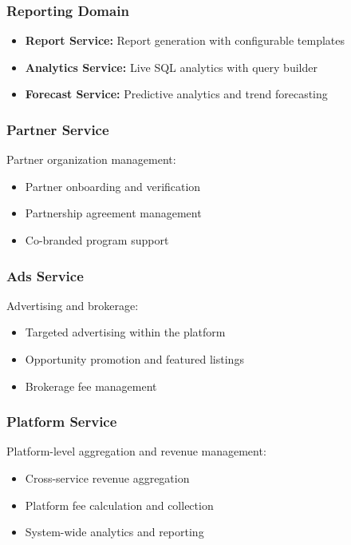 \subsubsection{Reporting Domain}

\begin{itemize}
  \item \textbf{Report Service:} Report generation with configurable templates
  \item \textbf{Analytics Service:} Live SQL analytics with query builder
  \item \textbf{Forecast Service:} Predictive analytics and trend forecasting
\end{itemize}

\subsubsection{Partner Service}

Partner organization management:
\begin{itemize}
  \item Partner onboarding and verification
  \item Partnership agreement management
  \item Co-branded program support
\end{itemize}

\subsubsection{Ads Service}

Advertising and brokerage:
\begin{itemize}
  \item Targeted advertising within the platform
  \item Opportunity promotion and featured listings
  \item Brokerage fee management
\end{itemize}

\subsubsection{Platform Service}

Platform-level aggregation and revenue management:
\begin{itemize}
  \item Cross-service revenue aggregation
  \item Platform fee calculation and collection
  \item System-wide analytics and reporting
\end{itemize}

\clearpage
